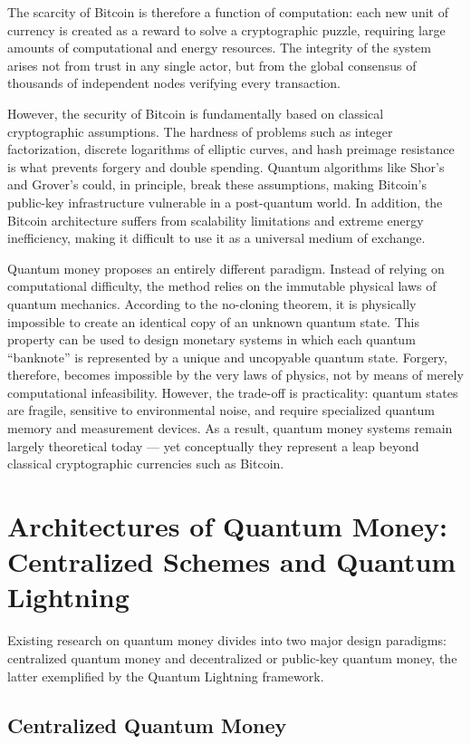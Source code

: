 The scarcity of Bitcoin is therefore a function of computation: each new unit of currency is created as a reward to solve a cryptographic puzzle, requiring large amounts of computational and energy resources. The integrity of the system arises not from trust in any single actor, but from the global consensus of thousands of independent nodes verifying every transaction.

However, the security of Bitcoin is fundamentally based on classical cryptographic assumptions. The hardness of problems such as integer factorization, discrete logarithms of elliptic curves, and hash preimage resistance is what prevents forgery and double spending. Quantum algorithms like Shor’s and Grover’s could, in principle, break these assumptions, making Bitcoin’s public-key infrastructure vulnerable in a post-quantum world. In addition, the Bitcoin architecture suffers from scalability limitations and extreme energy inefficiency, making it difficult to use it as a universal medium of exchange.

Quantum money proposes an entirely different paradigm. Instead of relying on computational difficulty, the method relies on the immutable physical laws of quantum mechanics. According to the no-cloning theorem, it is physically impossible to create an identical copy of an unknown quantum state. This property can be used to design monetary systems in which each quantum “banknote” is represented by a unique and uncopyable quantum state. Forgery, therefore, becomes impossible by the very laws of physics, not by means of merely computational infeasibility. However, the trade-off is practicality: quantum states are fragile, sensitive to environmental noise, and require specialized quantum memory and measurement devices. As a result, quantum money systems remain largely theoretical today — yet conceptually they represent a leap beyond classical cryptographic currencies such as Bitcoin.



\section{Architectures of Quantum Money: Centralized Schemes and Quantum Lightning}\label{s:2}
Existing research on quantum money divides into two major design paradigms: centralized quantum money and decentralized or public-key quantum money, the latter exemplified by the Quantum Lightning framework.

\subsection{Centralized Quantum Money}\label{s:2.1}

